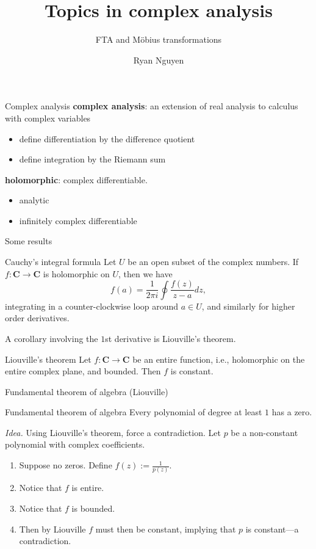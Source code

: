 \documentclass{beamer}
\title[Complex analysis]{Topics in complex analysis}
\subtitle{FTA and M\"{o}bius transformations}
\author{Ryan Nguyen}
\institute{}
\date{}
\begin{document}

\begin{frame}
\titlepage
\end{frame}

\begin{frame}[t]{Complex analysis} \vspace{4pt}
\textbf{complex analysis}: an extension of real analysis to calculus with complex variables
\begin{itemize}
	\item define differentiation by the difference quotient
	\item define integration by the Riemann sum
\end{itemize}
\textbf{holomorphic}: complex differentiable.
\begin{itemize}
	\item analytic
	\item infinitely complex differentiable
\end{itemize}
\end{frame}

\begin{frame}[t]{Some results} \vspace{3pt}
\begin{block}{Cauchy's integral formula}
Let \(U\) be an open subset of the complex numbers. If \(f: \mathbf{C} \rightarrow \mathbf{C}\) is holomorphic on \(U\), then we have
\[
f(a) = \frac{1}{2\pi i} \oint \frac{f(z)}{z-a} dz,
\]
integrating in a counter-clockwise loop around \(a \in U\), and similarly for higher order derivatives.
\end{block}
A corollary involving the \(1\)st derivative is Liouville's theorem.
\begin{block}{Liouville's theorem}
Let \(f: \mathbf{C} \rightarrow \mathbf{C}\) be an entire function, i.e., holomorphic on the entire complex plane, and bounded. Then \(f\) is constant.
\end{block}
\end{frame}

\begin{frame}[t]{Fundamental theorem of algebra (Liouville)} \vspace{4pt}
\begin{block}{Fundamental theorem of algebra}
Every polynomial of degree at least \(1\) has a zero.
\end{block}
\textit{Idea.} Using Liouville's theorem, force a contradiction. Let \(p\) be a non-constant polynomial with complex coefficients.
\begin{enumerate}
	\item Suppose no zeros. Define \(f(z) := \frac{1}{p(z)}\).
	\item Notice that \(f\) is entire.
	\item Notice that \(f\) is bounded.
	\item Then by Liouville \(f\) must then be constant, implying that \(p\) is constant---a contradiction.
\end{enumerate}
\end{frame}
\end{document}
